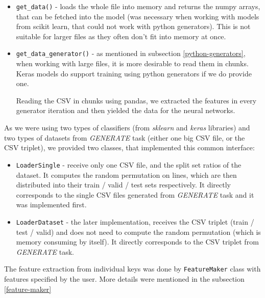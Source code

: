 \begin{itemize}

\item \texttt{get\_data()} - loads the whole file into memory and returns the numpy arrays, that can be fetched into the model (was necessary when working with models from scikit learn, that could not work with python generators). This is not suitable for larger files as they often don't fit into memory at once.

\item \texttt{get\_data\_generator()} - as mentioned in subsection \ref{python-generators}, when working with large files, it is more desirable to read them in chunks. Keras models do support training using python generators if we do provide one.

Reading the CSV in chunks using pandas, we extracted the features in every generator iteration and then yielded the data for the neural networks.

\end{itemize}

\noindent
As we were using two types of classifiers (from \textit{sklearn} and \textit{keras} libraries) and two types of datasets from \textit{GENERATE} task (either one big CSV file, or the CSV triplet), we provided two classes, that implemented this common interface:

\begin{itemize}

\item \texttt{LoaderSingle} - receive only one CSV file, and the split set ratios of the dataset. It computes the random permutation on lines, which are then distributed into their train / valid / test sets respectively. It directly corresponds to the single CSV files generated from \textit{GENERATE} task and it was implemented first.

\item \texttt{LoaderDataset} - the later implementation, receives the CSV triplet (train / test / valid) and does not need to compute the random permutation (which is memory consuming by itself). It directly corresponds to the CSV triplet from \textit{GENERATE} task.

\end{itemize}

\noindent
The feature extraction from individual keys was done by \texttt{FeatureMaker} class with features specified by the user. More details were mentioned in the subsection \ref{feature-maker}

